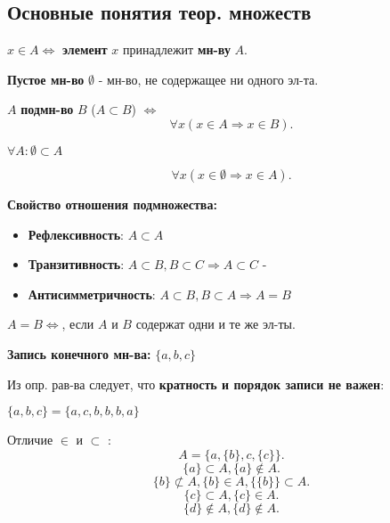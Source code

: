 \subsection{Основные понятия теор. множеств}
\begin{symb}
    $x \in A \iff$ \textbf{элемент } $x$ принадлежит \textbf{мн-ву} $A$.
\end{symb}
\begin{definition}
    \textbf{Пустое мн-во} $\emptyset$ - мн-во, не содержащее ни одного эл-та.
\end{definition}
\begin{definition}
    $A$ \textbf{подмн-во} $B$ ($A \subset B$) $\iff$ 
    \[
    \forall x (x \in A \Rightarrow x \in B)
    .\] 
\end{definition}
\begin{note}
    $\forall A \colon \emptyset \subset A$
\end{note}
\begin{note}
\[
\forall x (x \in \emptyset \Rightarrow x \in A)
.\] 
\end{note}
\textbf{Свойство отношения подмножества:}
\begin{itemize}
    \item \textbf{Рефлексивность}: $A \subset A$
    \item\textbf{Транзитивность}: $A \subset B, B \subset C \Rightarrow A \subset C$ - 
    \item \textbf{Антисимметричность}: $A \subset B, B \subset A \Rightarrow A = B$
\end{itemize}
\begin{definition}[Равенство мн-в]
$A = B \iff $, если $A$ и $B$ содержат одни и те же эл-ты.
\end{definition}
\textbf{Запись конечного мн-ва:} $\{a, b, c\}$
 \begin{note}
 Из опр. рав-ва следует, что \textbf{кратность и порядок записи не важен}:
 \begin{example}
    $\{a, b, c\} = \{a, c, b, b, b, a\}$
 \end{example}
 
\end{note}
 
\begin{note}
Отличие $\in$ и $\subset$ :
\[
A = \{a, \{b\}, c, \{c\}\}
.\] 
\[
\{a\} \subset A, \{a\} \not\in A
.\]  
\[
\{b\} \not\subset A, \{b\} \in A, \{\{b\}\} \subset A
.\] 
\[
\{c\} \subset A, \{c\}\in A
.\] 
\[
\{d\} \not\in A, \{ d\}\not\in A 
.\] 
\end{note}

